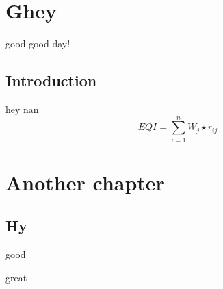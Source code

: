 \documentclass[individual-report]{senior-design}
\begin{document}
\individualreportcover
\finalreportcover
\tableofcontents
\chapter{Ghey}
good good day!
\section{Introduction}
hey nan
\begin{equation}
    EQI = \sum_{i=1}^{n}W_j\star r_{ij}
\end{equation}
\chapter{Another chapter}
\section{Hy}
good \cite{feucht2018}

great \cite{ieee-ethics}
% 
% 
\end{document}
